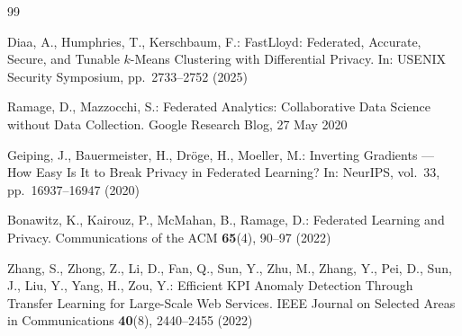 \documentclass[11pt]{article}
\theoremstyle{plain}
\theoremstyle{definition}
\begin{document}
\begin{thebibliography}{99}

Diaa, A., Humphries, T., Kerschbaum, F.:
FastLloyd: Federated, Accurate, Secure, and Tunable $k$-Means Clustering with
Differential Privacy. In: USENIX Security Symposium, pp.\ 2733--2752 (2025)

Ramage, D., Mazzocchi, S.:
Federated Analytics: Collaborative Data Science without Data Collection.
Google Research Blog, 27 May 2020

Geiping, J., Bauermeister, H., Dr\"oge, H., Moeller, M.:
Inverting Gradients --- How Easy Is It to Break Privacy in Federated Learning?
In: NeurIPS, vol.\ 33, pp.\ 16937--16947 (2020)

Bonawitz, K., Kairouz, P., McMahan, B., Ramage, D.:
Federated Learning and Privacy. Communications of the ACM \textbf{65}(4), 90--97 (2022)

Zhang, S., Zhong, Z., Li, D., Fan, Q., Sun, Y., Zhu, M., Zhang, Y., Pei, D.,
Sun, J., Liu, Y., Yang, H., Zou, Y.:
Efficient KPI Anomaly Detection Through Transfer Learning for Large-Scale Web
Services. IEEE Journal on Selected Areas in Communications \textbf{40}(8),
2440--2455 (2022)
\end{thebibliography}
\end{document}
